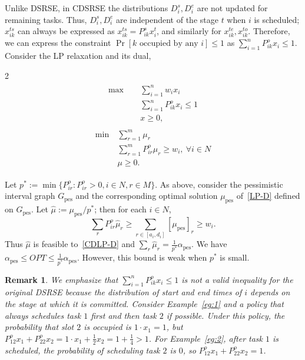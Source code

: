 \documentclass{article}
\newtheorem{remark}[theorem]{Remark}
\DeclareMathOperator{\pes}{pes}
\begin{document}
Unlike DSRSE, in CDSRSE the distributions $D_i^s, D_i^e$ are not updated for remaining tasks.
Thus, $D_i^s,D_i^e$ are independent of the stage $t$ when $i$ is scheduled; $x_{ik}^{ts}$ can always be expressed as $x_{ik}^{ts}=P_{ik}^{s}x^t_i$, and similarly for $x_{ik}^{te}, x_{ik}^{to}$.
Therefore, we can express the constraint $\Pr[\text{$k$ occupied by any $i$}]\leq 1$ as $\sum_{i=1}^{n}P_{ik}^o x_i\leq 1$.
Consider the LP relaxation and its dual,
\begin{multicols}{2}
\noindent
\begin{align*}
\label{CDLP-P}
\tag{CDLP-P}
\begin{split}
    \max\quad~&\sum_{i=1}^{n}w_ix_i\\
    & \sum_{i=1}^{n}P_{ik}^o x_i\leq1\\
    &x\geq 0,
    \end{split}
\end{align*}   
\columnbreak
\begin{align*}
\label{CDLP-D}
\tag{CDLP-D}
\begin{split}
    \min~&\sum_{r=1}^{m}\mu_r\\
    &\sum_{r=1}^{m}P^o_{ir}\mu_r\geq w_i,~\forall i\in N\\
    &\mu\geq 0.
    \end{split}
\end{align*}
\end{multicols}
%
\noindent
Let $p^*:=\min\{P_{ir}^o:P_{ir}^o>0, i\in N,r\in M\}$.
As above, consider the pessimistic interval graph $G_\pes$ and the corresponding optimal solution $\mu_{\pes}$ of~\eqref{LP-D} defined on $G_\pes$.
Let $\hat{\mu}:=\mu_{\pes}/p^*$; then for each $i\in N$,
\[\sum_{r}P_{ir}^o\hat{\mu}_r\geq \sum_{r\in [a_i,d_i]} [\mu_{\pes}]_r\geq w_i.\]
Thus $\hat{\mu}$ is feasible to~\eqref{CDLP-D} and $\sum_{r}\hat{\mu}_r = \frac{1}{p^*}\alpha_{\pes}.$
We have $\alpha_{\pes}\leq OPT\leq \frac{1}{p^*}\alpha_{\pes}$.
However, this bound is weak when $p^*$ is small.
\begin{remark}
    We emphasize that $\sum_{i=1}^{n}P_{ik}^{o}x_i\leq 1$ is not a valid inequality for the original DSRSE because the distribution of start and end times of $i$ depends on the stage at which it is committed. 
Consider Example~\ref{eg:1} and a policy that always schedules task $1$ first and then task $2$ if possible.
Under this policy, the probability that slot $2$ is occupied is $1\cdot x_1 = 1$, but $P_{12}^ox_1+P_{22}^o x_2= 1\cdot x_1+\frac{1}{2}x_2=1+\frac{1}{4}>1$.
For Example~\ref{eg:2}, after task $1$ is scheduled, the probability of scheduling task $2$ is $0$, so $P_{12}^ox_1+P_{22}^o x_2= 1$.
\end{remark}
\end{document}
